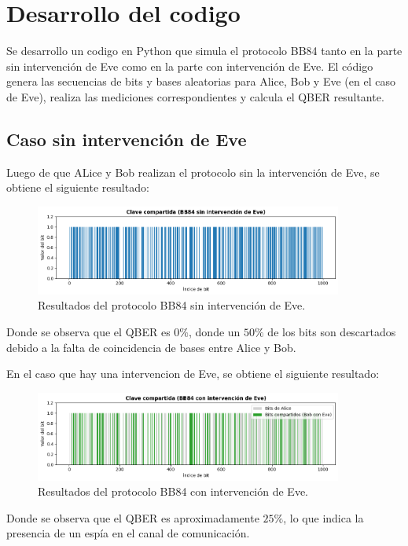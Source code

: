 \documentclass[12pt]{article}
\begin{document}
\section{Desarrollo del codigo}

Se desarrollo un codigo en Python que simula el protocolo BB84 tanto en la parte sin
intervención de Eve como en la parte con intervención de Eve. El código genera las
secuencias de bits y bases aleatorias para Alice, Bob y Eve (en el caso de Eve), 
realiza las mediciones correspondientes y calcula el QBER resultante.

\subsection{Caso sin intervención de Eve}

Luego de que ALice y Bob realizan el protocolo sin la intervención de Eve, se obtiene el siguiente resultado:

\begin{figure}
    \centering
    \includegraphics[width=0.9\textwidth]{caso_1.png}
    \caption{Resultados del protocolo BB84 sin intervención de Eve.}
\end{figure}

Donde se observa que el QBER es $0\%$, donde un $50\%$ de los bits son descartados
debido a la falta de coincidencia de bases entre Alice y Bob.

En el caso que hay una intervencion de Eve, se obtiene el siguiente resultado:

\begin{figure}
    \centering
    \includegraphics[width=0.9\textwidth]{caso_2.png}
    \caption{Resultados del protocolo BB84 con intervención de Eve.}
\end{figure}

Donde se observa que el QBER es aproximadamente $25\%$, lo que indica la presencia
de un espía en el canal de comunicación.
\end{document}
